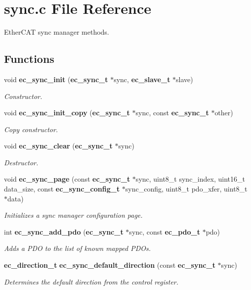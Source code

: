 \section{sync.\-c \-File \-Reference}
\label{sync_8c}


\-Ether\-C\-A\-T sync manager methods.  


\subsection*{\-Functions}
\begin{DoxyCompactItemize}
\item 
void {\bf ec\-\_\-sync\-\_\-init} ({\bf ec\-\_\-sync\-\_\-t} $\ast$sync, {\bf ec\-\_\-slave\-\_\-t} $\ast$slave)
\begin{DoxyCompactList}\small\item\em \-Constructor. \end{DoxyCompactList}\item 
void {\bf ec\-\_\-sync\-\_\-init\-\_\-copy} ({\bf ec\-\_\-sync\-\_\-t} $\ast$sync, const {\bf ec\-\_\-sync\-\_\-t} $\ast$other)
\begin{DoxyCompactList}\small\item\em \-Copy constructor. \end{DoxyCompactList}\item 
void {\bf ec\-\_\-sync\-\_\-clear} ({\bf ec\-\_\-sync\-\_\-t} $\ast$sync)
\begin{DoxyCompactList}\small\item\em \-Destructor. \end{DoxyCompactList}\item 
void {\bf ec\-\_\-sync\-\_\-page} (const {\bf ec\-\_\-sync\-\_\-t} $\ast$sync, uint8\-\_\-t sync\-\_\-index, uint16\-\_\-t data\-\_\-size, const {\bf ec\-\_\-sync\-\_\-config\-\_\-t} $\ast$sync\-\_\-config, uint8\-\_\-t pdo\-\_\-xfer, uint8\-\_\-t $\ast$data)
\begin{DoxyCompactList}\small\item\em \-Initializes a sync manager configuration page. \end{DoxyCompactList}\item 
int {\bf ec\-\_\-sync\-\_\-add\-\_\-pdo} ({\bf ec\-\_\-sync\-\_\-t} $\ast$sync, const {\bf ec\-\_\-pdo\-\_\-t} $\ast$pdo)
\begin{DoxyCompactList}\small\item\em \-Adds a \-P\-D\-O to the list of known mapped \-P\-D\-Os. \end{DoxyCompactList}\item 
{\bf ec\-\_\-direction\-\_\-t} {\bf ec\-\_\-sync\-\_\-default\-\_\-direction} (const {\bf ec\-\_\-sync\-\_\-t} $\ast$sync)
\begin{DoxyCompactList}\small\item\em \-Determines the default direction from the control register. \end{DoxyCompactList}\end{DoxyCompactItemize}


